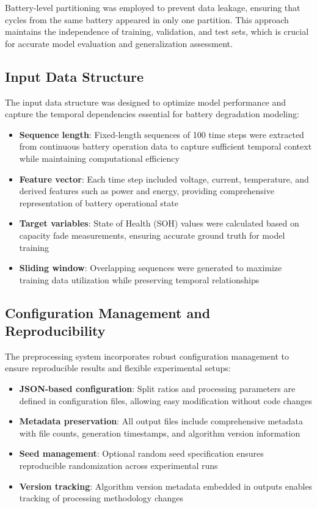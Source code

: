 Battery-level partitioning was employed to prevent data leakage, ensuring that cycles from the same battery appeared in only one partition. This approach maintains the independence of training, validation, and test sets, which is crucial for accurate model evaluation and generalization assessment.

\subsection{Input Data Structure}
\label{subsec:input_data_structure}

The input data structure was designed to optimize model performance and capture the temporal dependencies essential for battery degradation modeling:

\begin{itemize}
    \item \textbf{Sequence length}: Fixed-length sequences of 100 time steps were extracted from continuous battery operation data to capture sufficient temporal context while maintaining computational efficiency
    \item \textbf{Feature vector}: Each time step included voltage, current, temperature, and derived features such as power and energy, providing comprehensive representation of battery operational state
    \item \textbf{Target variables}: State of Health (SOH) values were calculated based on capacity fade measurements, ensuring accurate ground truth for model training
    \item \textbf{Sliding window}: Overlapping sequences were generated to maximize training data utilization while preserving temporal relationships
\end{itemize}

\subsection{Configuration Management and Reproducibility}
\label{subsec:config_management}

The preprocessing system incorporates robust configuration management to ensure reproducible results and flexible experimental setups:

\begin{itemize}
    \item \textbf{JSON-based configuration}: Split ratios and processing parameters are defined in configuration files, allowing easy modification without code changes
    \item \textbf{Metadata preservation}: All output files include comprehensive metadata with file counts, generation timestamps, and algorithm version information
    \item \textbf{Seed management}: Optional random seed specification ensures reproducible randomization across experimental runs
    \item \textbf{Version tracking}: Algorithm version metadata embedded in outputs enables tracking of processing methodology changes
\end{itemize}

